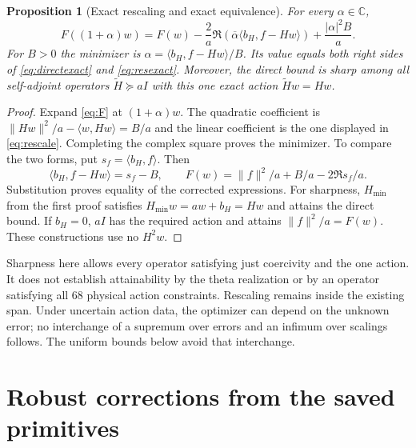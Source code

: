 \documentclass[11pt,a4paper]{article}
\newcommand{\C}{\mathbb C}
\newcommand{\ip}[2]{\langle #1,#2\rangle}
\newcommand{\norm}[1]{\lVert #1\rVert}
\newtheorem{proposition}[theorem]{Proposition}
\theoremstyle{definition}
\theoremstyle{remark}
\numberwithin{equation}{section}
\begin{document}
\begin{proposition}[Exact rescaling and exact equivalence]\label{prop:rescale}
For every $\alpha\in\C$,
\begin{equation}\label{eq:rescale}
 F((1+\alpha)w)
 =F(w)-\frac2a\Re\!\left(\overline\alpha
                    \ip{b_H}{f-Hw}\right)+\frac{|\alpha|^2B}{a}.
\end{equation}
For $B>0$ the minimizer is
$\alpha=\ip{b_H}{f-Hw}/B$. Its value equals both right sides of
\eqref{eq:directexact} and \eqref{eq:resexact}.
Moreover, the direct bound is sharp among all self-adjoint operators
$\widetilde H\succeq aI$ with this one exact action
$\widetilde H w=Hw$.
\end{proposition}
\begin{proof}
Expand \eqref{eq:F} at $(1+\alpha)w$. The quadratic coefficient is
$\norm{Hw}^2/a-\ip w{Hw}=B/a$ and the linear coefficient is the one
displayed in \eqref{eq:rescale}. Completing the complex square proves
the minimizer. To compare the two forms, put $s_f=\ip{b_H}f$.
Then
\[
 \ip{b_H}{f-Hw}=s_f-B,\qquad
 F(w)=\norm f^2/a+B/a-2\Re s_f/a.
\]
Substitution proves equality of the corrected expressions.
For sharpness, $H_{\min}$ from the first proof satisfies
$H_{\min}w=aw+b_H=Hw$ and attains the direct bound.
If $b_H=0$, $aI$ has the required action and attains
$\norm f^2/a=F(w)$. These constructions use no $H^2w$.
\end{proof}

Sharpness here allows every operator satisfying just coercivity and the
one action. It does not establish attainability by the theta realization
or by an operator satisfying all 68 physical action constraints.
Rescaling remains inside the existing span. Under uncertain action data,
the optimizer can depend on the unknown error; no interchange of a
supremum over errors and an infimum over scalings follows. The uniform
bounds below avoid that interchange.

\section{Robust corrections from the saved primitives}\label{sec:robust}
\end{document}
